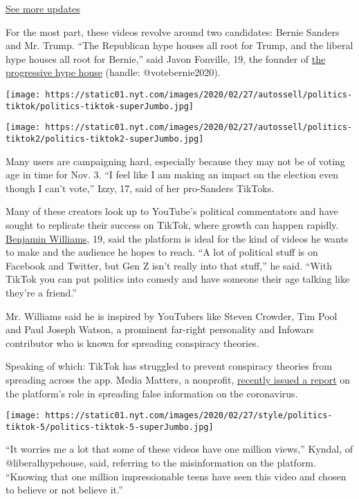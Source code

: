 \href{https://www.nytimes.com/2020/07/31/us/elections/biden-vs-trump.html?action=click\&pgtype=Article\&state=default\&region=MAIN_CONTENT_1\&context=storylines_live_updates}{See
more updates}

For the most part, these videos revolve around two candidates: Bernie
Sanders and Mr. Trump. ``The Republican hype houses all root for Trump,
and the liberal hype houses all root for Bernie,'' said Javon Fonville,
19, the founder of \href{https://www.tiktok.com/@votebernie2020}{the
progressive hype house} (handle: @votebernie2020).

\texttt{[image: https://static01.nyt.com/images/2020/02/27/autossell/politics-tiktok/politics-tiktok-superJumbo.jpg]}

\texttt{[image: https://static01.nyt.com/images/2020/02/27/autossell/politics-tiktok2/politics-tiktok2-superJumbo.jpg]}

Many users are campaigning hard, especially because they may not be of
voting age in time for Nov. 3. ``I feel like I am making an impact on
the election even though I can't vote,'' Izzy, 17, said of her
pro-Sanders TikToks.

Many of these creators look up to YouTube's political commentators and
have sought to replicate their success on TikTok, where growth can
happen rapidly.
\href{https://www.tiktok.com/@beanjaminpolitics}{Benjamin Williams}, 19,
said the platform is ideal for the kind of videos he wants to make and
the audience he hopes to reach. ``A lot of political stuff is on
Facebook and Twitter, but Gen Z isn't really into that stuff,'' he said.
``With TikTok you can put politics into comedy and have someone their
age talking like they're a friend.''

Mr. Williams said he is inspired by YouTubers like Steven Crowder, Tim
Pool and Paul Joseph Watson, a prominent far-right personality and
Infowars contributor who is known for spreading conspiracy theories.

Speaking of which: TikTok has struggled to prevent conspiracy theories
from spreading across the app. Media Matters, a nonprofit,
\href{https://www.mediamatters.org/fake-news/tiktok-hosting-videos-spreading-misinformation-about-coronavirus-despite-platforms-new}{recently
issued a report} on the platform's role in spreading false information
on the coronavirus.

\texttt{[image: https://static01.nyt.com/images/2020/02/27/style/politics-tiktok-5/politics-tiktok-5-superJumbo.jpg]}

``It worries me a lot that some of these videos have one million
views,'' Kyndal, of @liberalhypehouse, said, referring to the
misinformation on the platform. ``Knowing that one million
impressionable teens have seen this video and chosen to believe or not
believe it.''

